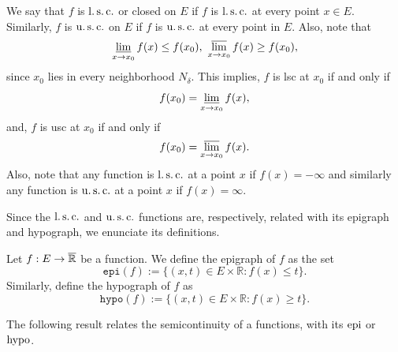     
    We say that $f$ is $\operatorname{l.s.c.}$  or closed on $E$ if $f$ is $\operatorname{l.s.c.}$
    at every point $x \in E$. Similarly, $f$ is $\operatorname{u.s.c.}$ on $E$ 
    if $f$ is $\operatorname{u.s.c.}$ at every point in $E$. Also, note that 
    \begin{equation*}
        \varliminf_{x \to x_0} f(x) \leq f(x_0), \, \, %
        \varlimsup_{x \to x_0} f(x) \geq f(x_0),
    \end{equation*}
    since $x_0$ lies in every neighborhood $N_{\delta}$. This implies, 
    $f$ is lsc at $x_0$ if and only if
    $$
        f(x_0) = \varliminf_{x \to x_0} f(x),
    $$
    and, $f$ is usc at $x_0$ if and only if
    $$
        f(x_0) = \varlimsup_{x \to x_0} f(x).
    $$
    Also, note that any function is $\operatorname{l.s.c.}$ at a point $x$ if $f(x) = - \infty$
    and similarly any function is $\operatorname{u.s.c.}$ at a point $x$ if $f(x) = \infty$. 
    
    \noindent Since the $\operatorname{l.s.c.}$ and $\operatorname{u.s.c.}$ functions are, respectively, related
    with its epigraph and hypograph, we enunciate its definitions.
    \begin{definition}
        Let $f : E \to \overline{\mathbb{R}}$ be a function. We define the epigraph of $f$
        as the set
        \begin{equation*}
            \mathtt{epi}(f) := \{ (x, t) \in E \times \mathbb{R} : f(x) \leq t \}.
        \end{equation*}
        Similarly, define the hypograph of $f$ as
        \begin{equation*}
            \mathtt{hypo}(f) := \{ (x,t) \in E \times \mathbb{R} : f(x) \geq t \}.
        \end{equation*}
    \end{definition}
    
    \noindent The following result relates the semicontinuity of a functions, 
    with its $\operatorname{epi}$ or $\operatorname{hypo}$.
    
